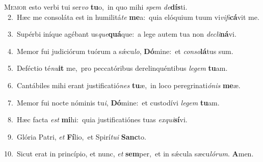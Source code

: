 \lettrine{\initial\textcolor{\initialcolor}{M}}{emor} esto verbi tui ser\textit{vo} \textbf{tu}\-o,~\star in quo mihi \textit{spem} \textit{de}\-\textbf{dís}ti.\\
{\numbfont\textcolor{\numbcolor}{~2.}}~Hæc me consoláta est in humilitá\textit{te} \textbf{me}\-a:~\star quia elóquium tuum vi\-\textit{vi}\-\textit{fi}\textbf{cá}vit me.\par
{\numbfont\textcolor{\numbcolor}{~3.}}~Supérbi iníque agébant us\-\textit{que}\-\textbf{quá}que:~\star a lege autem tua non \textit{de}\-\textit{cli}\textbf{ná}vi.\par
{\numbfont\textcolor{\numbcolor}{~4.}}~Memor fui judiciórum tuórum a sǽcu\-\textit{lo}\-, \textbf{Dó}\-mine:~\star et \textit{con}\-\textit{so}\textbf{lá}tus sum.\par
{\numbfont\textcolor{\numbcolor}{~5.}}~Deféctio té\-\textit{nu}\-\textbf{it} me,~\star pro peccatóribus derelinquéntibus \textit{le}\-\textit{gem} \textbf{tu}\-am.\par
{\numbfont\textcolor{\numbcolor}{~6.}}~Cantábiles mihi erant justificatió\textit{nes} \textbf{tu}\-æ,~\star in loco peregrinati\-\textit{ó}\-\textit{nis} \textbf{me}\-æ.\par
{\numbfont\textcolor{\numbcolor}{~7.}}~Memor fui nocte nóminis tu\-\textit{i}\-, \textbf{Dó}\-mine:~\star et custodívi \textit{le}\-\textit{gem} \textbf{tu}\-am.\par
{\numbfont\textcolor{\numbcolor}{~8.}}~Hæc facta \textit{est} \textbf{mi}\-hi:~\star quia justificatiónes tuas \textit{ex}\-\textit{qui}\textbf{sí}vi.\par
{\numbfont\textcolor{\numbcolor}{~9.}}~Glória Patri, \textit{et} \textbf{Fí}\-lio,~\star et Spirí\-\textit{tu}\-\textit{i} \textbf{Sanc}\-to.\par
{\numbfont\textcolor{\numbcolor}{10.}}~Sicut erat in princípio, et nunc, \textit{et} \textbf{sem}\-per,~\star et in sǽcula sæcu\-\textit{ló}\-\textit{rum}. \textbf{A}\-men.\par
